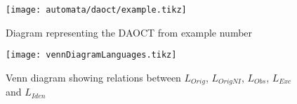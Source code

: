 \begin{figure}[H]
  \centering \texttt{[image: automata/daoct/example.tikz]}
  \caption{Diagram representing the DAOCT from example number }
\end{figure}

\usetikzlibrary{patterns}
\begin{figure}[H]
  \centering \texttt{[image: vennDiagramLanguages.tikz]}
  \caption{Venn diagram showing relations between $L_{Orig}$, $L_{OrigNI}$,
    $L_{Obs}$, $L_{Exc}$ and $L_{Iden}$}
\end{figure}


